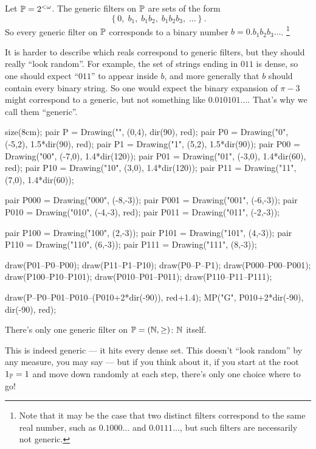 \begin{example}
	Let $\mathbb P = 2^{<\omega}$.
	The generic filters on $\mathbb P$ are sets of the form
	\[ \left\{ 0,\; b_1,\; b_1b_2,\; b_1b_2b_3,\; \dots \right\}. \]
	So every generic filter on $\mathbb P$ corresponds
	to a binary number $b = 0.b_1b_2b_3\dots$.%
	\footnote{Note that it may be the case that two distinct filters correspond to the same real
	number, such as $0.1000\dots$ and $0.0111\dots$, but such filters are necessarily not generic.}

	It is harder to describe which reals correspond to generic filters,
	but they should really ``look random''.
	For example, the set of strings ending in $011$ is dense,
	so one should expect ``$011$'' to appear inside $b$,
	and more generally that $b$ should contain every binary string.
	So one would expect the binary expansion of $\pi-3$ might correspond to a generic,
	but not something like $0.010101\dots$.
	That's why we call them ``generic''.

	\begin{center}
		\begin{asy}
			size(8cm);
			pair P = Drawing("\varnothing", (0,4), dir(90), red);
			pair P0 = Drawing("0", (-5,2), 1.5*dir(90), red);
			pair P1 = Drawing("1", (5,2),  1.5*dir(90));
			pair P00 = Drawing("00", (-7,0), 1.4*dir(120));
			pair P01 = Drawing("01", (-3,0), 1.4*dir(60), red);
			pair P10 = Drawing("10", (3,0),  1.4*dir(120));
			pair P11 = Drawing("11", (7,0),  1.4*dir(60));

			pair P000 = Drawing("000", (-8,-3));
			pair P001 = Drawing("001", (-6,-3));
			pair P010 = Drawing("010", (-4,-3), red);
			pair P011 = Drawing("011", (-2,-3));

			pair P100 = Drawing("100", (2,-3));
			pair P101 = Drawing("101", (4,-3));
			pair P110 = Drawing("110", (6,-3));
			pair P111 = Drawing("111", (8,-3));

			draw(P01--P0--P00);
			draw(P11--P1--P10);
			draw(P0--P--P1);
			draw(P000--P00--P001);
			draw(P100--P10--P101);
			draw(P010--P01--P011);
			draw(P110--P11--P111);

			draw(P--P0--P01--P010--(P010+2*dir(-90)), red+1.4);
			MP("G", P010+2*dir(-90), dir(-90), red);
		\end{asy}
	\end{center}
\end{example}

\begin{example}
	There's only one generic filter on $\mathbb P = (\mathbb N, \geq)$: $\mathbb N$ itself.

	This is indeed generic --- it hits every dense set.
	This doesn't ``look random'' by any measure, you may say ---
	but if you think about it, if you start at the root $1_\mathbb P = 1$ and move down randomly at each
	step, there's only one choice where to go!
\end{example}

